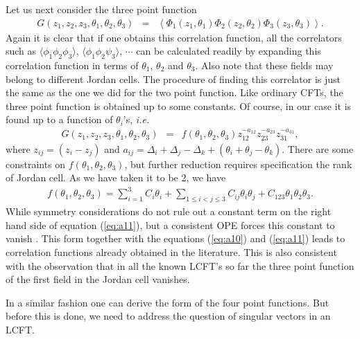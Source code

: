 \documentclass[a4paper,11pt]{article}
\begin{document}
Let us next consider the three point function
\begin{eqnarray}\label{eq:a9}
G(z_{1},z_{2},z_{3},\theta_{1},\theta_{2},\theta_{3})&=&\left<
\Phi_{1}(z_{1},\theta_{1})\Phi_{2}(z_{2},\theta_{2})
\Phi_{3}(z_{3},\theta_{3})\right>.
\end{eqnarray}
Again it is clear that if one obtains this correlation function,
all the correlators such as
$\langle\phi_{1}\phi_{2}\phi_{3}\rangle$,
$\langle\phi_{1}\phi_{2}\psi_{3}\rangle$, $\cdots$ can be
calculated readily by expanding this correlation function in
terms of $\theta_{1}$, $\theta_{2}$ and $\theta_{3}$. Also note
that these fields may belong to different Jordan cells. The
procedure of finding this correlator is just the same as the one
we did for the two point function. Like ordinary CFTs, the three
point function is obtained up to some constants. Of course, in
our case it is found up to a function of $\theta_{i}$'s, {\it
i.e.}
\begin{eqnarray}\label{eq:a10}
G(z_{1},z_{2},z_{3},\theta_{1},\theta_{2},\theta_{3})&=&
f(\theta_{1},\theta_{2},\theta_{3})z_{12}^{-a_{12}}z_{23}^{-a_{23}}z_{31}^{-a_{31}},
\end{eqnarray}
where $z_{ij}=(z_{i}-z_{j})$ and
$a_{ij}=\Delta_{i}+\Delta_{j}-\Delta_{k}+(\theta_{i}+\theta_{j}-\theta_{k})$.
There are some constraints on
$f(\theta_{1},\theta_{2},\theta_{3})$, but further reduction
requires specification the rank of Jordan cell. As we have taken
it to be 2, we have
\begin{eqnarray}\label{eq:a11}
f(\theta_{1},\theta_{2},\theta_{3})=\sum_{i=1}^{3}C_{i}\theta_{i}
+\sum_{1\leq i<j\leq3}C_{ij}\theta_{i}\theta_{j}
+C_{123}\theta_{1}\theta_{2}\theta_{3} .
\end{eqnarray}
While symmetry considerations do not rule out a constant term on
the right hand side of equation (\ref{eq:a11}), but a consistent
OPE forces this constant to vanish \cite{mog,floh2}. This form
together with the equations (\ref{eq:a10}) and (\ref{eq:a11})
leads to correlation functions already obtained in the
literature. This is also consistent with the observation that in
all the known LCFT's so far the three point function of the first
field in the Jordan cell vanishes.

In a similar fashion one can derive the form of the four point
functions. But before this is done, we need to address the
question of singular vectors in an LCFT.
\end{document}
